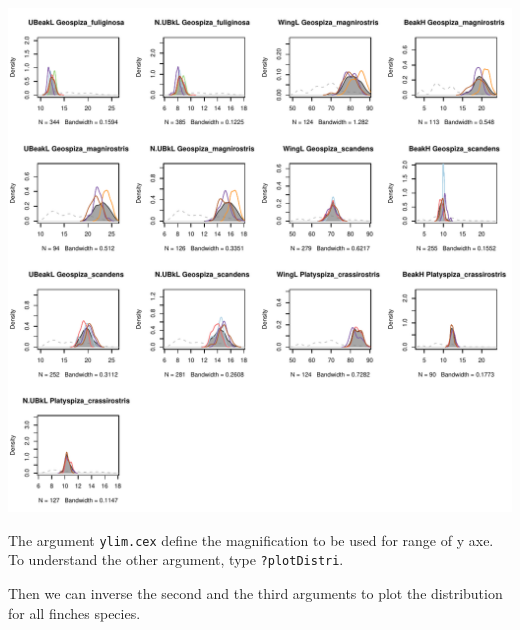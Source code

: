 \documentclass[12pt]{article}\usepackage[]{graphicx}\usepackage[]{color}
\makeatletter
\def\maxwidth{ %
  \ifdim\Gin@nat@width>\linewidth
    \linewidth
  \else
    \Gin@nat@width
  \fi
}
\newenvironment{knitrout}{}{} %
\makeatother
\begin{document}
\begin{knitrout}
\includegraphics[width=\maxwidth]{figure/unnamed-chunk-103} 

\end{knitrout}
The argument \texttt{ylim.cex} define the magnification to be used for range of y axe. To understand the other argument, type \texttt{?plotDistri}.

\newpage

Then we can inverse the second and the third arguments to plot the distribution for all finches species. 
\end{document}
